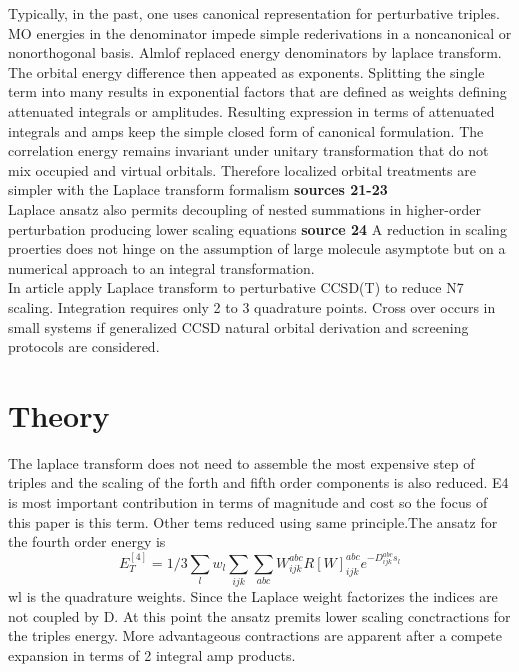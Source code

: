 \documentclass[10pt, draft]{article}
\begin{document}
Typically, in the past, one uses canonical representation for perturbative triples. MO energies in the denominator impede simple rederivations in a noncanonical or nonorthogonal basis.  Almlof replaced energy denominators by laplace transform.  The orbital energy difference then appeated as exponents.  Splitting the single term into many results in exponential factors that are defined as weights defining attenuated integrals or amplitudes.  Resulting expression in terms of attenuated integrals and amps keep the simple closed form of canonical formulation.  The correlation energy remains invariant under unitary transformation that do not mix occupied and virtual orbitals. Therefore localized orbital treatments are simpler with the Laplace transform formalism \textbf{sources 21-23}\\
Laplace ansatz also permits decoupling of nested summations in higher-order perturbation producing lower scaling equations \textbf{source 24} A reduction in scaling proerties does not hinge on the assumption of large molecule asymptote but on a numerical approach to an integral transformation.  \\
In article apply Laplace transform to perturbative CCSD(T) to reduce N7 scaling.  Integration requires only 2 to 3 quadrature points.  Cross over occurs in small systems if generalized CCSD natural orbital derivation and screening protocols are considered.  

\section{Theory}
The laplace transform does not need to assemble the most expensive step of triples and the scaling of the forth and fifth order components is also reduced.  E4 is most important contribution in terms of magnitude and cost so the focus of this paper is this term.  Other tems reduced using same principle.\linebreak[1]
The ansatz for the fourth order energy is 
\[E_T^{[4]} = 1/3 \sum_l w_l \sum_{ijk} \sum_{abc} W^{abc}_{ijk} R[W]^{abc}_{ijk} e^{-D^{abc}_{ijk} s_l}\]
wl is the quadrature weights. Since the Laplace weight factorizes the indices are not coupled by D.  At this point the ansatz premits lower scaling conctractions for the triples energy.  More advantageous contractions are apparent after a compete expansion in terms of 2 integral amp products.  
\end{document}
